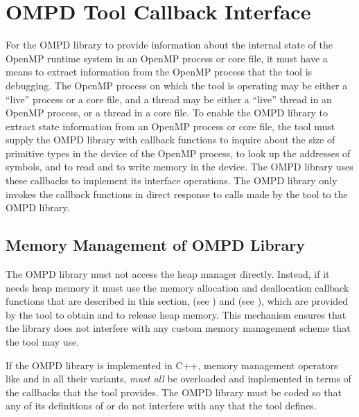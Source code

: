 \section{OMPD Tool Callback Interface}
\label{subsec:ompd-tool-callback-interface}
\label{subsec:third-party-tool-callback-interface}

For the OMPD library to provide information about the internal state of the 
OpenMP runtime system in an OpenMP process or core file, it must have a means 
to extract information from the OpenMP process that the tool is debugging.
The OpenMP process on which the tool is operating may be either a ``live'' 
process or a core file, and a thread may be either a ``live'' thread in an 
OpenMP process, or a thread in a core file. To enable the OMPD library to 
extract state information from an OpenMP process or core file, the tool must 
supply the OMPD library with callback functions to inquire about the size of 
primitive types in the device of the OpenMP process, to look up the addresses 
of symbols, and to read and to write memory in the device. The OMPD library 
uses these callbacks to implement its interface operations. The OMPD library 
only invokes the callback functions in direct response to calls made by the 
tool to the OMPD library.



\subsection{Memory Management of OMPD Library}
The OMPD library must not access the heap manager directly. Instead, if it 
needs heap memory it must use the memory allocation and deallocation callback 
functions that are described in this section, 
(see ) and 
(see ), which are
provided by the tool to obtain and to release heap memory. This mechanism
ensures that the library does not interfere with any custom memory management 
scheme that the tool may use.

If the OMPD library is implemented in C++, memory management operators like 
 and  in all their variants, \emph{must all} be overloaded 
and implemented in terms of the callbacks that the tool provides. The OMPD 
library must be coded so that any of its definitions of  or 
 do not interfere with any that the tool defines.

